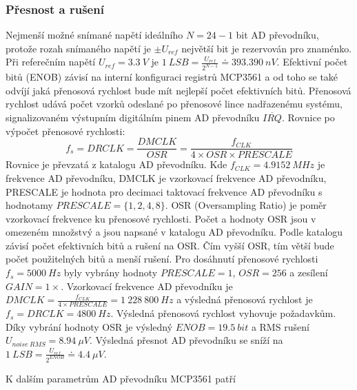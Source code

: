\subsubsection{Přesnost a rušení}
Nejmenší možné snímané napětí ideálního $N = 24 - 1$ bit AD převodníku, protože rozah snímaného napětí je $\pm U_{ref}$ největší bit je rezervován pro znaménko. Při referečním napětí $U_{ref} = 3.3 \ V $ je $ 1 \ LSB = \frac{U_{ref}}{2^{N-1}} \doteq  393.390  \ nV$.
Efektivní počet bitů (ENOB) závisí na interní konfiguraci registrů MCP3561 a od toho se také odvíjí jaká přenosová rychlost bude mít nejlepší počet efektivních bitů. Přenosová rychlost udává počet vzorků odeslané po přenosové lince nadřazenému systému, signalizovaném výstupním digitálním pinem AD převodníku $\overline{IRQ}$.
Rovnice po výpočet přenosové rychlosti:
\begin{equation}
    f_s = DRCLK = \frac{DMCLK}{OSR} =\frac{f_{CLK}}{4 \times OSR \times PRESCALE}
\end{equation}
Rovnice je převzatá z katalogu AD převodníku. Kde $f_{CLK} = 4.9152 \ MHz$ je frekvence AD převodníku, DMCLK je vzorkovací frekvence AD převodníku, PRESCALE je hodnota pro decimaci taktovací frekvence AD převodníku s hodnotamy $PRESCALE = \{1, 2, 4, 8\}$.  OSR (Oversampling Ratio) je poměr vzorkovací frekvence ku přenosové rychlosti. Počet a hodnoty OSR jsou v omezeném množstvý a jsou napsané v katalogu AD převodníku. Podle katalogu závisí počet efektivních bitů a rušení na OSR.
Čím vyšší OSR, tím větší bude počet použitelných bitů a menší rušení. Pro dosáhnutí přenosové rychlosti $f_s = 5000 \ Hz$ byly vybrány hodnoty $PRESCALE = 1$, $OSR = 256$ a zesílení $GAIN = 1 \times$. Vzorkovací frekvence AD převodníku je $DMCLK = \frac{f_{CLK}}{4 \times PRESCALE} = 1 \ 228 \ 800 \ Hz$ a výsledná přenosová rychlost je $f_s = DRCLK = 4800 \ Hz$. Výsledná přenosová rychlost vyhovuje požadavkům. Díky vybrání hodnoty OSR je výsledný $ENOB = 19.5 \ bit$ a RMS rušení $U_{noise \ RMS} = 8.94 \ \mu V$.
Výsledná přesnot AD převodníku se sníží na $ 1 \ LSB = \frac{U_{ref}}{2^{ENOB}} \doteq  4.4 \ \mu V$.
\par
K dalším parametrům AD převodníku MCP3561 patří
